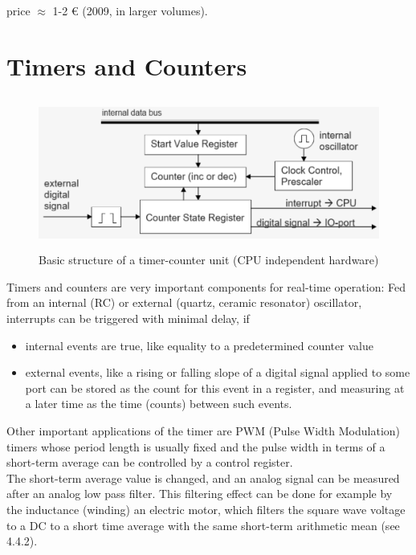 price $\mathrm{\approx}$ 1-2 € (2009, in larger volumes).
\newpage

\section{Timers and Counters}

    \begin{figure}[h]
    \centering
    \includegraphics[width=14cm, height=5cm]{Images/image162.png}
    \caption{Basic structure of a timer-counter unit (CPU independent hardware)}
    \label{fig:Fig 115}
    \end{figure}

Timers and counters are very important components for real-time operation: Fed from an internal (RC) or external (quartz, ceramic resonator) oscillator, interrupts can be triggered with minimal delay, if

\begin{itemize}
\item  internal events are true, like equality to a predetermined counter value
\item  external events, like a rising or falling slope of a digital signal applied to some port can be stored as the count for this event in a register, and measuring at a later time as the time (counts) between such events.
\end{itemize}

Other important applications of the timer are PWM (Pulse Width Modulation) timers whose period length is usually fixed and the pulse width in terms of a short-term average can be controlled by a control register.\\

The short-term average value is changed, and an analog signal can be measured after an analog low pass filter. This filtering effect can be done for example by the inductance (winding) an electric motor, which filters the square wave voltage to a DC to a short time average with the same short-term arithmetic mean (see 4.4.2).\\
\newpage

